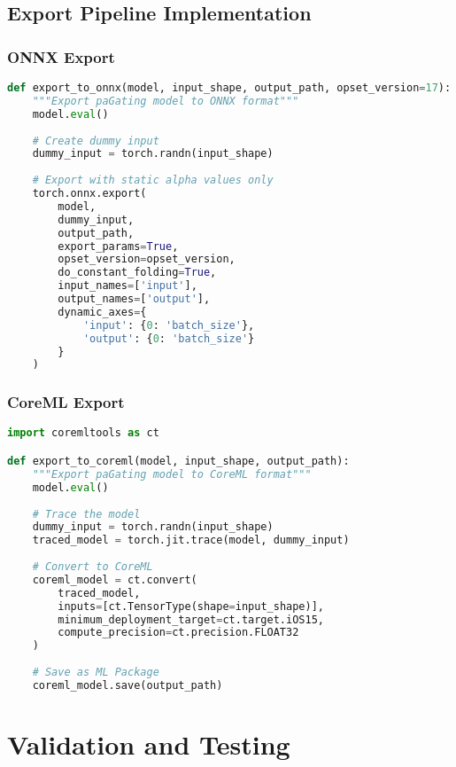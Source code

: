 \documentclass[journal]{IEEEtran}
\begin{document}
\subsection{Export Pipeline Implementation}

\subsubsection{ONNX Export}
\begin{lstlisting}[language=python]
def export_to_onnx(model, input_shape, output_path, opset_version=17):
    """Export paGating model to ONNX format"""
    model.eval()
    
    # Create dummy input
    dummy_input = torch.randn(input_shape)
    
    # Export with static alpha values only
    torch.onnx.export(
        model,
        dummy_input,
        output_path,
        export_params=True,
        opset_version=opset_version,
        do_constant_folding=True,
        input_names=['input'],
        output_names=['output'],
        dynamic_axes={
            'input': {0: 'batch_size'},
            'output': {0: 'batch_size'}
        }
    )
\end{lstlisting}

\subsubsection{CoreML Export}
\begin{lstlisting}[language=python]
import coremltools as ct

def export_to_coreml(model, input_shape, output_path):
    """Export paGating model to CoreML format"""
    model.eval()
    
    # Trace the model
    dummy_input = torch.randn(input_shape)
    traced_model = torch.jit.trace(model, dummy_input)
    
    # Convert to CoreML
    coreml_model = ct.convert(
        traced_model,
        inputs=[ct.TensorType(shape=input_shape)],
        minimum_deployment_target=ct.target.iOS15,
        compute_precision=ct.precision.FLOAT32
    )
    
    # Save as ML Package
    coreml_model.save(output_path)
\end{lstlisting}

\section{Validation and Testing}
\end{document}
